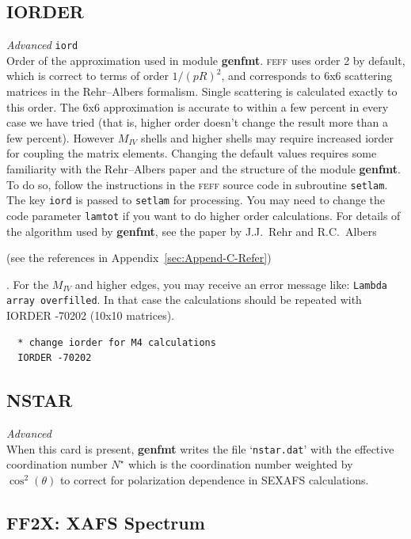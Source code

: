 \documentclass[11pt,oneside]{report} %
\newcommand{\program}[1]{\textsc{#1}}
\newcommand{\feff}{\program{feff}}
\newenvironment{Card}[4]%
      {\vspace{3ex}%
        \subsection{#1}
        \quad\textsl{#3}\newline
        \quad\texttt{#2}\newline%
        \label{card:#4}\\}
      {}
\newcommand{\file}[1]{`\texttt{#1}'}
\newcommand{\module}[1]{\textrm{\bf{#1}}}
\begin{document}
\begin{Card}{IORDER}{iord}{Advanced}{ior}
  Order of the approximation used in module \module{genfmt}. {\feff} uses
  order 2 by default, which is correct to terms of order $1/(pR)^2$,
  and corresponds to 6x6 scattering matrices in the Rehr--Albers
  formalism. Single scattering is calculated exactly to this order.
  The 6x6 approximation is accurate to within a few percent in every
  case we have tried (that is, higher order doesn't change the result
  more than a few percent). However $M_{\mathit{IV}}$ shells and
  higher shells may require increased iorder for coupling the matrix
  elements. Changing the default values requires some familiarity
  with the Rehr--Albers paper and the structure of the module \module{genfmt}.
  To do so, follow the instructions in the {\feff} source code in
  subroutine \texttt{setlam}. The key \texttt{iord} is passed to
  \texttt{setlam} for processing. You may need to change the code
  parameter \texttt{lamtot} if you want to do higher order
  calculations. For details of the algorithm used by \module{genfmt}, see the
  paper by J.J.\ Rehr and R.C.\ Albers
  \begin{latexonly}
    (see the references in Appendix~\ref{sec:Append-C-Refer})
  \end{latexonly}
  . For the
  $M_{\mathit{IV}}$ and higher edges, you may receive an error
  message like: \texttt{Lambda array overfilled}. In that case the
  calculations should be repeated with IORDER -70202 (10x10 matrices).
\begin{verbatim}
  * change iorder for M4 calculations
  IORDER -70202
\end{verbatim}
\end{Card}



\begin{Card}{NSTAR}{}{Advanced}{nst}
  When this card is present, \module{genfmt} writes the file
  \file{nstar.dat} with the effective coordination number $N^\star$
  which is the coordination number weighted by $\cos^2(\theta)$ to
  correct for polarization dependence in SEXAFS calculations.
\end{Card}



\subsection{FF2X: XAFS Spectrum}
\label{sec:Comb-contr-from}
\end{document}
